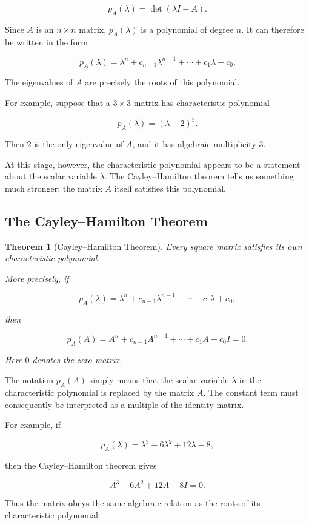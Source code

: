 \documentclass[11pt]{article}
\newtheorem{theorem}{Theorem}[section]
\begin{document}
\[
p_A(\lambda)=\det(\lambda I-A).
\]

Since \(A\) is an \(n\times n\) matrix, \(p_A(\lambda)\) is a polynomial
of degree \(n\).  It can therefore be written in the form

\[
p_A(\lambda)
=
\lambda^n
+c_{n-1}\lambda^{n-1}
+\cdots
+c_1\lambda
+c_0.
\]

The eigenvalues of \(A\) are precisely the roots of this polynomial.

For example, suppose that a \(3\times3\) matrix has characteristic
polynomial

\[
p_A(\lambda)=(\lambda-2)^3.
\]

Then \(2\) is the only eigenvalue of \(A\), and it has algebraic
multiplicity \(3\).

At this stage, however, the characteristic polynomial appears to be a
statement about the scalar variable \(\lambda\).  The Cayley--Hamilton
theorem tells us something much stronger: the matrix \(A\) itself
satisfies this polynomial.

\subsection{The Cayley--Hamilton Theorem}

\begin{theorem}[Cayley--Hamilton Theorem]
Every square matrix satisfies its own characteristic polynomial.

More precisely, if

\[
p_A(\lambda)
=
\lambda^n
+c_{n-1}\lambda^{n-1}
+\cdots
+c_1\lambda
+c_0,
\]

then

\[
\boxed{
p_A(A)
=
A^n
+c_{n-1}A^{n-1}
+\cdots
+c_1A
+c_0I
=
0.
}
\]

Here \(0\) denotes the zero matrix.
\end{theorem}

The notation \(p_A(A)\) simply means that the scalar variable
\(\lambda\) in the characteristic polynomial is replaced by the
matrix \(A\).  The constant term must consequently be interpreted as
a multiple of the identity matrix.

For example, if

\[
p_A(\lambda)
=
\lambda^3-6\lambda^2+12\lambda-8,
\]

then the Cayley--Hamilton theorem gives

\[
A^3-6A^2+12A-8I=0.
\]

Thus the matrix obeys the same algebraic relation as the roots of its
characteristic polynomial.
\end{document}
